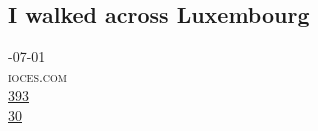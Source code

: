 \documentclass[10pt,a4paper]{article}
\begin{document}
\subsection{I walked across Luxembourg}
\noindent\begin{minipage}[t]{0.20\linewidth}
\vspace{0pt}
\noindent\textsc{\footnotesize
{\scriptsize\faCalendar}-07-01 \\
{\scriptsize\faGlobe}\space 
ioces.com \\
{\scriptsize\faThumbsOUp}\space 
\href{http://news.ycombinator.com/item?id=37218841\&utm\_term=comment}{393} \\
{\scriptsize\faComments}\space 
\href{http://news.ycombinator.com/item?id=37218841\&utm\_term=comment}{30} \\
}
\end{minipage} 
\end{document}
